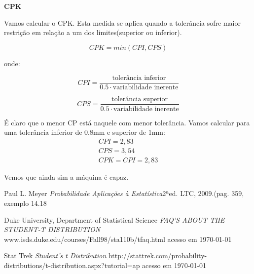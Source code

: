 \textbf{CPK}


 Vamos calcular o CPK. Esta medida se aplica quando a tolerância sofre maior restrição em relação a um dos limites(superior ou inferior). 
 
 \begin{equation}
 	CPK = min(CPI, CPS)
 \end{equation}
 
 onde:
 
 \begin{equation}
 	CPI = \frac{\mbox{tolerância inferior}}{0.5 \cdot \mbox{variabilidade inerente}}
 \end{equation}
 
  \begin{equation}
 	CPS = \frac{\mbox{tolerância superior}}{0.5 \cdot \mbox{variabilidade inerente}}
 \end{equation}
 
 É claro que o menor CP está naquele com menor tolerância. Vamos calcular para uma tolerância inferior de 0.8mm e superior de 1mm:
\begin{equation}
\begin{array}{l}
CPI =2,83\\
CPS = 3,54 \\
CPK = CPI = 2,83
\end{array}
\end{equation} 

Vemos que ainda sim a máquina é capaz.
 
 \begin{thebibliography}{1}

  		Paul L. Meyer
  		\emph{Probabilidade Aplicações à Estatística}2ªed. LTC, 2009.(pag. 359, exemplo 14.18
	
		Duke University, Department of Statistical Science  	
  		\emph{FAQ'S ABOUT THE STUDENT-T DISTRIBUTION} www.isds.duke.edu/courses/Fall98/sta110b/tfaq.html
  		acesso em \today
  		
		Stat Trek 	
  		\emph{Student's t Distribution} http://stattrek.com/probability-distributions/t-distribution.aspx?tutorial=ap
  		acesso em \today

\end{thebibliography}



